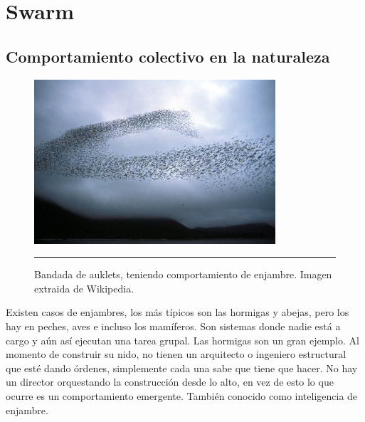 
\chapter{Swarm} %

\label{Chapter2} %



\section{Comportamiento colectivo en la naturaleza}

\begin{figure}[htbp]
	\centering
		\includegraphics[width=0.8\textwidth]{./Figures/swarm.jpg}
		\rule{35em}{0.5pt}
	\caption[Bandada]{Bandada de auklets, teniendo comportamiento de enjambre. Imagen extraida de Wikipedia.}
	\label{fig:Bandada}
\end{figure}

Existen casos de enjambres, los más típicos son las hormigas y abejas, pero los hay en peches, aves e incluso los mamíferos. Son sistemas donde nadie está a cargo y aún así ejecutan una tarea grupal. Las hormigas son un gran ejemplo. Al momento de construir su nido, no tienen un arquitecto o ingeniero estructural que esté dando órdenes, simplemente cada una sabe que tiene que hacer. No hay un director orquestando la construcción desde lo alto, en vez de esto lo que ocurre es un comportamiento emergente. También conocido como inteligencia de enjambre.

